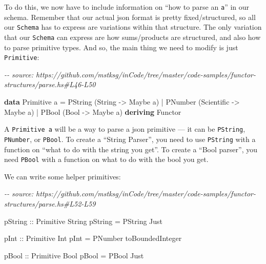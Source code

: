 \documentclass[]{article}
\newenvironment{Shaded}{}{}
\newcommand{\CommentTok}[1]{\textcolor[rgb]{0.38,0.63,0.69}{\textit{#1}}}
\newcommand{\DataTypeTok}[1]{\textcolor[rgb]{0.56,0.13,0.00}{#1}}
\newcommand{\KeywordTok}[1]{\textcolor[rgb]{0.00,0.44,0.13}{\textbf{#1}}}
\newcommand{\NormalTok}[1]{#1}
\newcommand{\OperatorTok}[1]{\textcolor[rgb]{0.40,0.40,0.40}{#1}}
\newcommand{\OtherTok}[1]{\textcolor[rgb]{0.00,0.44,0.13}{#1}}
\begin{document}
To do this, we now have to include information on ``how to parse an \texttt{a}''
in our schema. Remember that our actual json format is pretty fixed/structured,
so all our \texttt{Schema} has to express are variations within that structure.
The only variation that our \texttt{Schema} can express are how sums/products
are structured, and also how to parse primitive types. And so, the main thing we
need to modify is just \texttt{Primitive}:

\begin{Shaded}
\begin{Highlighting}[]
\CommentTok{{-}{-} source: https://github.com/mstksg/inCode/tree/master/code{-}samples/functor{-}structures/parse.hs\#L46{-}L50}

\KeywordTok{data} \DataTypeTok{Primitive}\NormalTok{ a }\OtherTok{=}
      \DataTypeTok{PString}\NormalTok{ (}\DataTypeTok{String} \OtherTok{{-}>} \DataTypeTok{Maybe}\NormalTok{ a)}
    \OperatorTok{|} \DataTypeTok{PNumber}\NormalTok{ (}\DataTypeTok{Scientific} \OtherTok{{-}>} \DataTypeTok{Maybe}\NormalTok{ a)}
    \OperatorTok{|} \DataTypeTok{PBool}\NormalTok{   (}\DataTypeTok{Bool} \OtherTok{{-}>} \DataTypeTok{Maybe}\NormalTok{ a)}
  \KeywordTok{deriving} \DataTypeTok{Functor}
\end{Highlighting}
\end{Shaded}

A \texttt{Primitive\ a} will be a way to parse a json primitive --- it can be
\texttt{PString}, \texttt{PNumber}, or \texttt{PBool}. To create a ``String
Parser'', you need to use \texttt{PString} with a function on ``what to do with
the string you get''. To create a ``Bool parser'', you need \texttt{PBool} with
a function on what to do with the bool you get.

We can write some helper primitives:

\begin{Shaded}
\begin{Highlighting}[]
\CommentTok{{-}{-} source: https://github.com/mstksg/inCode/tree/master/code{-}samples/functor{-}structures/parse.hs\#L52{-}L59}

\OtherTok{pString ::} \DataTypeTok{Primitive} \DataTypeTok{String}
\NormalTok{pString }\OtherTok{=} \DataTypeTok{PString} \DataTypeTok{Just}

\OtherTok{pInt ::} \DataTypeTok{Primitive} \DataTypeTok{Int}
\NormalTok{pInt }\OtherTok{=} \DataTypeTok{PNumber}\NormalTok{ toBoundedInteger}

\OtherTok{pBool ::} \DataTypeTok{Primitive} \DataTypeTok{Bool}
\NormalTok{pBool }\OtherTok{=} \DataTypeTok{PBool} \DataTypeTok{Just}
\end{Highlighting}
\end{Shaded}
\end{document}
